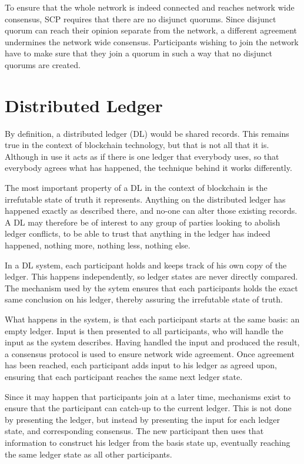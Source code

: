 To ensure that the whole network is indeed connected and reaches network wide consensus, SCP requires that there are no disjunct quorums. Since disjunct quorum can reach their opinion separate from the network, a different agreement undermines the network wide consensus. Participants wishing to join the network have to make sure that they join a quorum in such a way that no disjunct quorums are created.

\section{Distributed Ledger}
By definition, a distributed ledger \cite{DL} (DL) would be shared records. This remains true in the context of blockchain technology, but that is not all that it is. Although in use it acts as if there is one ledger that everybody uses, so that everybody agrees what has happened, the technique behind it works differently.

The most important property of a DL in the context of blockchain is the irrefutable state of truth it represents. Anything on the distributed ledger has happened exactly as described there, and no-one can alter those existing records. A DL may therefore be of interest to any group of parties looking to abolish ledger conflicts, to be able to trust that anything in the ledger has indeed happened, nothing more, nothing less, nothing else.

In a DL system, each participant holds and keeps track of his own copy of the ledger. This happens independently, so ledger states are never directly compared. The mechanism used by the sytem ensures that each participants holds the exact same conclusion on his ledger, thereby assuring the irrefutable state of truth.

What happens in the system, is that each participant starts at the same basis: an empty ledger. Input is then presented to all participants, who will handle the input as the system describes. Having handled the input and produced the result, a consensus protocol is used to ensure network wide agreement. Once agreement has been reached, each participant adds input to his ledger as agreed upon, ensuring that each participant reaches the same next ledger state.

Since it may happen that participants join at a later time, mechanisms exist to ensure that the participant can catch-up to the current ledger. This is not done by presenting the ledger, but instead by presenting the input for each ledger state, and corresponding consensus. The new participant then uses that information to construct his ledger from the basis state up, eventually reaching the same ledger state as all other participants.

